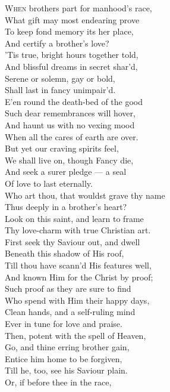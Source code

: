 \textsc{When} brothers part for manhood’s race, \\
 What gift may most endearing prove \\
 To keep fond memory its her place, \\
 And certify a brother’s love? \\
  ’Tis true, bright hours together told, \\
 And blissful dreams in secret shar’d, \\
 Serene or solemn, gay or bold, \\
 Shall last in fancy unimpair’d. \\
  E’en round the death-bed of the good \\
 Such dear remembrances will hover, \\
 And haunt us with no vexing mood \\
 When all the cares of earth are over. \\
  But yet our craving spirits feel, \\
 We shall live on, though Fancy die, \\
 And seek a surer pledge — a seal \\
 Of love to last eternally. \\
  Who art thou, that wouldst grave thy name \\
 Thus deeply in a brother’s heart? \\
 Look on this saint, and learn to frame \\
 Thy love-charm with true Christian art. \\
  First seek thy Saviour out, and dwell \\
 Beneath this shadow of His roof, \\
 Till thou have scann’d His features well, \\
 And known Him for the Christ by proof; \\
  Such proof as they are sure to find \\
 Who spend with Him their happy days, \\
 Clean hands, and a self-ruling mind \\
 Ever in tune for love and praise. \\
  Then, potent with the spell of Heaven, \\
 Go, and thine erring brother gain, \\
 Entice him home to be forgiven, \\
 Till he, too, see his Saviour plain. \\
  Or, if before thee in the race, \\

